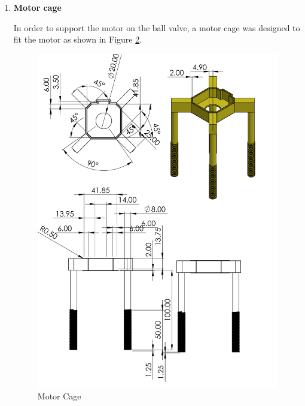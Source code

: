\begin{enumerate}
\begin{enumerate}
\begin{figure}[H]
        \caption{Interface}
        \label{fig:Interface}
    \end{figure}
    Figure \ref{fig:Interface} shows the interface design. Dimensions of the interface, such as the width of its base, were measured and transferred from the existing lever.
    \par
    \item \textbf{Motor cage}
    \par
    In order to support the motor on the ball valve, a motor cage was designed to fit the motor as shown in Figure \ref{fig:motor_cage_stepper}.
    
    \begin{figure}[H]
        \centering
        \includegraphics[height=.55\textheight]{Figures/MotorCage.PNG}
        \caption{Motor Cage}
        \label{fig:motor_cage_stepper}
    \end{figure}
    

\end{enumerate}
\end{enumerate}
